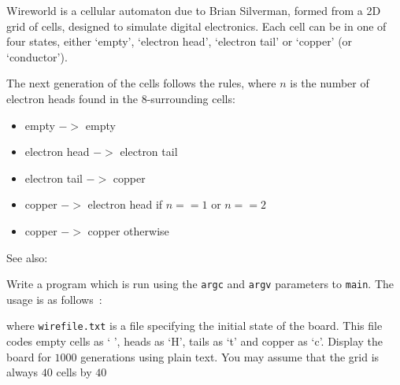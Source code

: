 
Wireworld is a cellular automaton due to Brian Silverman, formed from a 2D grid
of cells, designed to simulate digital electronics. Each cell can be in one
of four states, either `empty', `electron head', `electron tail' or `copper' (or `conductor').

The next generation of the cells follows the rules, where $n$ is the number of electron heads found in the 8-surrounding cells:
\begin{itemize}
\item empty $->$ empty
\item electron head $->$ electron tail
\item electron tail $->$ copper
\item copper $->$ electron head if $n==1$ or $n==2$
\item copper $->$ copper otherwise
\end{itemize}
\noindent See also:\\

{\samepage
\begin{exercise}
\label{ex:wirew}
Write a program which is run using the \verb^argc^ and
\verb^argv^ parameters to \verb^main^. The usage is
as follows~:
where \verb^wirefile.txt^ is a file specifying the initial
state of the board. This file codes empty cells as ` ', 
heads as `H', tails as `t' and copper as `c'.
Display the board for $1000$ generations using plain text.
You may assume that the grid is always $40$ cells by $40$

\end{exercise}
}
